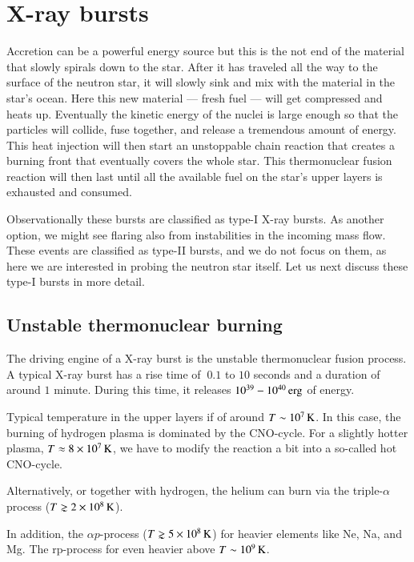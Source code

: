 \section{X-ray bursts}

Accretion can be a powerful energy source but this is the not end of the material that slowly spirals down to the star.
After it has traveled all the way to the surface of the neutron star, it will slowly sink and mix with the material in the star's ocean.
Here this new material --- fresh fuel --- will get compressed and heats up.
Eventually the kinetic energy of the nuclei is large enough so that the particles will collide, fuse together, and release a tremendous amount of energy.
This heat injection will then start an unstoppable chain reaction that creates a burning front that eventually covers the whole star.
This thermonuclear fusion reaction will then last until all the available fuel on the star's upper layers is exhausted and consumed.

Observationally these bursts are classified as type-I X-ray bursts.
As another option, we might see flaring also from instabilities in the incoming mass flow. 
These events are classified as type-II bursts, and we do not focus on them, as here we are interested in probing the neutron star itself.
Let us next discuss these type-I bursts in more detail.



\subsection{Unstable thermonuclear burning}

The driving engine of a X-ray burst is the unstable thermonuclear fusion process.
A typical X-ray burst has a rise time of $~0.1$ to $10$ seconds and a duration of around $1$ minute.
During this time, it releases $10^{39} - 10^{40} \, \mathrm{erg}$ of energy.

\cite{Lewin93}
\cite{SB10}

Typical temperature in the upper layers if of around $T \sim 10^7 \, \mathrm{K}$.
In this case, the burning of hydrogen plasma is dominated by the CNO-cycle.
For a slightly hotter plasma, $T \approx 8 \times 10^{7} \, \mathrm{K}$, we have to modify the reaction a bit into a so-called hot CNO-cycle.\cite{FH65}

Alternatively, or together with hydrogen, the helium can burn via the triple-$\alpha$ process ($T \gnsim 2 \times 10^{8} \, \mathrm{K}$).

In addition, the $\alpha p$-process ($T \gnsim 5 \times 10^{8} \, \mathrm{K}$) for heavier elements like Ne, Na, and Mg.
The rp-process for even heavier above $T \sim 10^9 \, \mathrm{K}$.  
\cite{Fujimoto81, Wallace81, Fisker08}

